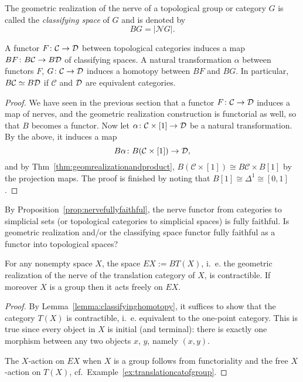 \documentclass[a4paper,openany]{scrbook}
\renewcommand{\C}{\mathcal C}
\newcommand{\nerve}{\mathcal N}
\begin{document}
\begin{defn}
The geometric realization of the nerve of a topological group or category $G$ is called the \emph{classifying space} of $G$ and is denoted by
\[
BG = |\nerve G|.
\]
\end{defn}



\begin{lemma}\label{lemma:classifyinghomotopy}
A functor $F\colon \C \to \D$ between topological categories induces a map $BF\colon B\C \to B\D$ of classifying spaces. A natural transformation $\alpha$ between functors $F$, $G\colon \C \to \D$ induces a homotopy between $BF$ and $BG$. In particular, $B\C \simeq B\D$ if $\C$ and $\mathcal D$ are equivalent categories.
\end{lemma}
\begin{proof}
We have seen in the previous section that a functor $F\colon \C \to \D$ induces a map of nerves, and the geometric realization construction is functorial as well, so that $B$ becomes a functor. Now let $\alpha\colon \C \times [1] \to \D$ be a natural transformation. By the above, it induces a map
\[
B\alpha\colon B(\C \times [1]) \to \D,
\]
and by Thm~\ref{thm:geomrealizationandproduct}, $B(\C \times [1]) \cong B\C \times B[1]$ by the projection maps. The proof is finished by noting that $B[1] \cong \Delta^1 \cong [0,1]$.
\end{proof}

\begin{exer}
By Proposition~\ref{prop:nervefullyfaithful}, the nerve functor from categories to simplicial sets (or topological categories to simplicial spaces) is fully faithful. Is geometric realization and/or the classifying space functor fully faithful as a functor into topological spaces?
\end{exer}

\begin{corollary}\label{cor:EG}
For any nonempty space $X$, the space $EX := BT(X)$, i.~e. the geometric realization of the nerve of the translation category of $X$, is contractible. If moreover $X$ is a group then it acts freely on $EX$.
\end{corollary}
\begin{proof}
By Lemma~\ref{lemma:classifyinghomotopy}, it suffices to show that the category $T(X)$ is contractible, i.~e. equivalent to the one-point category. This is true since every object in $X$ is initial (and terminal): there is exactly one morphism between any two objects $x$, $y$, namely $(x,y)$.

The $X$-action on $EX$ when $X$ is a group follows from functoriality and the free $X$-action on $T(X)$, cf.~Example~\ref{ex:translationcatofgroup}.
\end{proof}
\end{document}
